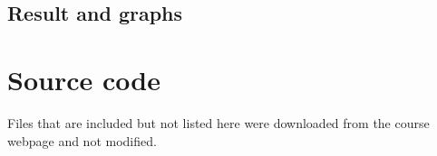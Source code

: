 \documentclass[a4paper,11pt]{article}
\begin{document}
\subsection{Result and graphs}

\clearpage

\begin{comment}
\paragraph\noindent\textbf{Overview of the linear program}
\begin{itemize}
\renewcommand{\labelitemi}{$\bullet$}
\item Load image from disk
\item Calculate average RGB sum
\item Calculate output image
\item Write image to disk
\end{itemize}

\begin{figure}[!h]
  \caption{Run times related to number of cores for the different images.}
  \label{runtime_vs_cores}
  \texttt{[image: ../plots/runtimevscoresthres.png]}
\end{figure}

\begin{table}[h!]
  \caption{$MPixels/Second$ when running with different amount of threads and on different data.}
  \label{mpixelspersecond}
  \begin{tabular}[h]{|l|l|l|l|l|l|}
    \hline
                      & 1      & 2      & 4      & 8      & 16\\
    \hline
    im1.ppm           & 135.41 & 183.31 & 184.94 & 68.89  & 21.77\\ 
    im2.ppm           & 150.01 & 209.17 & 274.71 & 201.65 & 63.15\\ 
    im3.ppm           & 146.25 & 209.72 & 274.44 & 275.62 & 138.23\\ 
    im4.ppm           & 145.07 & 212.56 & 286.41 & 332.90 & 297.42\\
    \hline
  \end{tabular}
\end{table}

\cite{fenwick}

\clearpage
\begin{thebibliography}{9}
  \bibitem{fenwick}
    Binary Indexed Trees,
    \emph{Algortihmist}.\\
    \url{http://community.topcoder.com/tc?module=Static\&d1=tutorials\&d2=binaryIndexedTrees}
  \bibitem{ppm}
    Mark Nelson,
    \emph{Arithmetic Coding + Statistical Modeling = Data Compression}, 1991.\\
    \url{http://marknelson.us/1991/02/01/arithmetic-coding-statistical-modeling-data-compression/}
  \bibitem{ppmc}
    PPM
    \url{http://www.cs.ucf.edu/courses/cap5015/ppm.pdf}

\end{thebibliography}a


\end{comment}

\clearpage
\section{Source code}
Files that are included but not listed here were downloaded from the course webpage and not modified.
\end{document}
